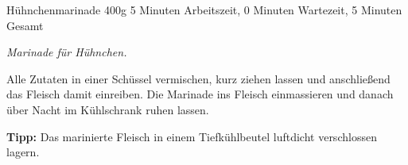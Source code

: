 \begin{recipe}{Hühnchenmarinade} {400g} {5 Minuten Arbeitszeit, 0 Minuten Wartezeit, 5 Minuten Gesamt}

  \freeform{}\textit{Marinade für Hühnchen.}


  Alle Zutaten in einer Schüssel vermischen, kurz ziehen lassen und anschließend das Fleisch damit einreiben.
  Die Marinade ins Fleisch einmassieren und danach über Nacht im Kühlschrank ruhen lassen.

  \freeform{}\hrulefill{}

  \freeform{}\textbf{Tipp:}
  Das marinierte Fleisch in einem Tiefkühlbeutel luftdicht verschlossen lagern.

\end{recipe}
